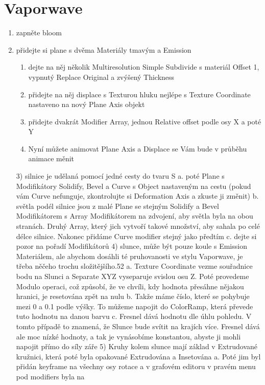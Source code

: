 \documentclass[12pt,a4paper]{report}
\begin{document}
	\section{Vaporwave}
	\begin{enumerate}
		\item zapněte bloom
		\item přidejte si plane s dvěma Materiály tmavým a Emission
		\begin{enumerate}
		\item dejte na něj několik Multiresolution Simple Subdivide
		s materiál Offset 1, vypnutý Replace Original a zvýšený
		Thickness
		\item přidejte na něj displace s Texturou hluku nejlépe s Texture
		Coordinate nastaveno na nový Plane Axis objekt
		\item přidejte dvakrát Modifier Array, jednou Relative offset podle
		osy X a poté Y
		\item Nyní můžete animovat Plane Axis a Displace se Vám bude
		v průběhu animace měnit
		\end{enumerate}
		3) silnice je udělaná pomocí jedné cesty do tvaru S
		a. poté Plane s Modifikátory Solidify, Bevel a Curve s Object
		nastaveným na cestu (pokud vám Curve nefunguje,
		zkontrolujte si Deformation Axis a zkuste ji změnit)
		b. světla podél silnice jsou z malé Plane se stejným Solidify a
		Bevel Modifikátorem s Array Modifikátorem na zdvojení, aby
		světla byla na obou stranách. Druhý Array, který jich vytvoří
		takové množství, aby sahala po celé délce silnice. Nakonec
		přidáme Curve modifier stejný jako předtím
		c. dejte si pozor na pořadí Modifikátorů
		4) slunce, může být pouze koule s Emission Materiálem, ale abychom
		dosáhli té pruhovanosti ve stylu Vaporwave, je třeba něčeho trochu
		složitějšího.52
		a. Texture Coordinate vezme souřadnice bodu na Slunci a
		Separate XYZ vyseparuje svislou osu Z. Poté provedeme
		Modulo operaci, což způsobí, že ve chvíli, kdy hodnota
		přesáhne nějakou hranici, je resetována zpět na nulu
		b. Takže máme číslo, které se pohybuje mezi 0 a 0.1 podle
		výšky. To můžeme napojit do ColorRamp, která převede tuto
		hodnotu na danou barvu
		c. Fresnel dává hodnotu dle úhlu pohledu. V tomto případě to
		znamená, že Slunce bude svítit na krajích více. Fresnel dává
		ale moc nízké hodnoty, a tak je vynásobíme konstantou,
		abyste ji mohli napojit přímo do síly záře
		5) Kruhy kolem slunce mají základ v Extrudované kružnici, která poté
		byla opakované Extrudována a Insetována
		a. Poté jim byl přidán keyframe na všechny osy rotace a
		v grafovém editoru v pravém menu pod modifiers byla na

\end{enumerate}
\end{document}
